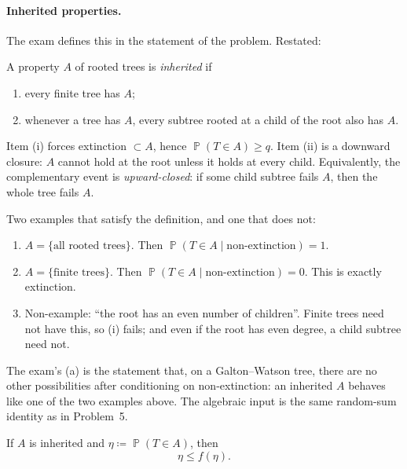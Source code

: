 \documentclass[11pt,a4paper]{article}
\DeclareMathOperator{\Pbb}{\mathbb{P}}
\begin{document}
\paragraph{Inherited properties.}
The exam defines this in the statement of the problem. Restated:

\begin{definition}
\label{def:inherited}
A property \(A\) of rooted trees is \emph{inherited} if
\begin{enumerate}[label=\textup{(\roman*)}]
    \item
    every finite tree has \(A\);
    \item
    whenever a tree has \(A\), every subtree rooted at a child of the root also has \(A\).
\end{enumerate}
\end{definition}

Item (i) forces extinction \(\subset A\), hence \(\Pbb(T\in A)\ge q\). Item (ii) is a downward closure: \(A\) cannot hold at the root unless it holds at every child. Equivalently, the complementary event is \emph{upward-closed}: if some child subtree fails \(A\), then the whole tree fails \(A\).

Two examples that satisfy the definition, and one that does not:
\begin{enumerate}[label=\textup{(\arabic*)}]
    \item
    \(A=\{\text{all rooted trees}\}\). Then \(\Pbb(T\in A\mid\text{non-extinction})=1\).
    \item
    \(A=\{\text{finite trees}\}\). Then \(\Pbb(T\in A\mid\text{non-extinction})=0\). This is exactly extinction.
    \item
    Non-example: ``the root has an even number of children''. Finite trees need not have this, so (i) fails; and even if the root has even degree, a child subtree need not.
\end{enumerate}

The exam's (a) is the statement that, on a Galton--Watson tree, there are no other possibilities after conditioning on non-extinction: an inherited \(A\) behaves like one of the two examples above. The algebraic input is the same random-sum identity as in Problem~5.

\begin{lemma}
\label{lem:inherited-pgf}
If \(A\) is inherited and \(\eta\coloneqq\Pbb(T\in A)\), then
\[
\eta
\le
f(\eta).
\]
\end{lemma}
\end{document}
